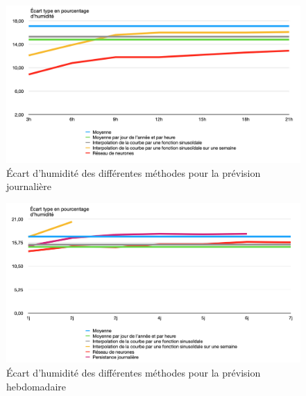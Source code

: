 \documentclass[11pt,a4paper]{article}
\begin{document}
\begin{figure} [!h]
\centering
\includegraphics[width=0.7 \textwidth]{./imagesTIPE/ecartjH.png}\quad
\caption{\label{fig:cosDS} Écart d'humidité des différentes méthodes pour la prévision journalière}
\end{figure}

\begin{figure} [!h]
\centering
\includegraphics[width= 0.7 \textwidth]{./imagesTIPE/ecartsH.png}\quad
\caption{\label{fig:cosDS} Écart d'humidité des différentes méthodes pour la prévision hebdomadaire}
\end{figure}
























\end{document}
